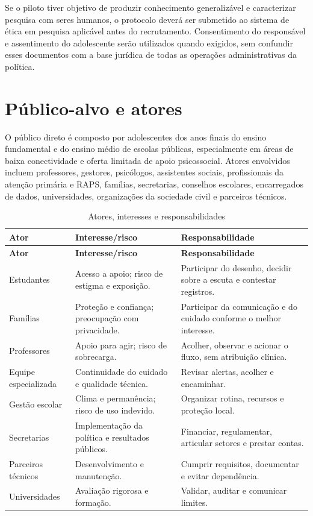 \documentclass[
  12pt,
  openright,
  oneside,
  a4paper,
  english,
  brazil
]{abntex2}
\begin{document}
Se o piloto tiver objetivo de produzir conhecimento generalizável e caracterizar
pesquisa com seres humanos, o protocolo deverá ser submetido ao sistema de ética
em pesquisa aplicável antes do recrutamento. Consentimento do responsável e
assentimento do adolescente serão utilizados quando exigidos, sem confundir
esses documentos com a base jurídica de todas as operações administrativas da
política.

\chapter{Público-alvo e atores}

O público direto é composto por adolescentes dos anos finais do ensino
fundamental e do ensino médio de escolas públicas, especialmente em áreas de
baixa conectividade e oferta limitada de apoio psicossocial. Atores envolvidos
incluem professores, gestores, psicólogos, assistentes sociais, profissionais da
atenção primária e RAPS, famílias, secretarias, conselhos escolares, encarregados
de dados, universidades, organizações da sociedade civil e parceiros técnicos.

\begin{longtable}{p{3.3cm}p{5cm}p{4.5cm}}
\caption{Atores, interesses e responsabilidades}\label{tab:atores}\\
\toprule
\textbf{Ator} & \textbf{Interesse/risco} & \textbf{Responsabilidade} \\
\midrule
\endfirsthead
\toprule
\textbf{Ator} & \textbf{Interesse/risco} & \textbf{Responsabilidade} \\
\midrule
\endhead
Estudantes & Acesso a apoio; risco de estigma e exposição. & Participar do desenho, decidir sobre a escuta e contestar registros. \\
Famílias & Proteção e confiança; preocupação com privacidade. & Participar da comunicação e do cuidado conforme o melhor interesse. \\
Professores & Apoio para agir; risco de sobrecarga. & Acolher, observar e acionar o fluxo, sem atribuição clínica. \\
Equipe especializada & Continuidade do cuidado e qualidade técnica. & Revisar alertas, acolher e encaminhar. \\
Gestão escolar & Clima e permanência; risco de uso indevido. & Organizar rotina, recursos e proteção local. \\
Secretarias & Implementação da política e resultados públicos. & Financiar, regulamentar, articular setores e prestar contas. \\
Parceiros técnicos & Desenvolvimento e manutenção. & Cumprir requisitos, documentar e evitar dependência. \\
Universidades & Avaliação rigorosa e formação. & Validar, auditar e comunicar limites. \\
\bottomrule
\end{longtable}
\end{document}
